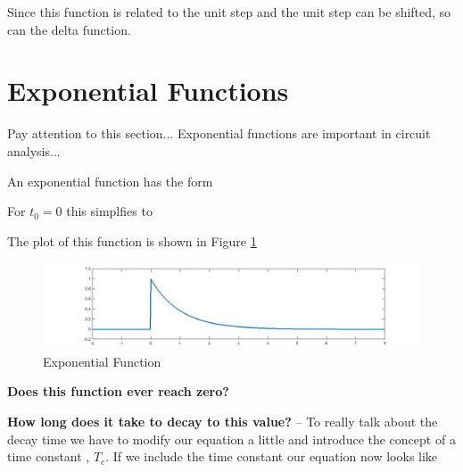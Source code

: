 \documentclass{handout}
\begin{document}
Since this function is related to the unit step and the unit step can be shifted, so can the delta function.

\newpage
\clearpage
\pagebreak

\section{Exponential Functions}
Pay attention to this section... Exponential functions are important in circuit analysis...

An exponential function has the form

For $t_0 =0$ this simplfies to

The plot of this function is shown in Figure \ref{fig: Exponential}
\begin{figure} [h!]
\centering
\includegraphics[width=1\textwidth]{Exponential.jpg}
\caption{Exponential Function}
\label{fig: Exponential}
\end{figure}

\textbf{Does this function ever reach zero?}

\textbf{How long does it take to decay to this value?} -- To really talk about the decay time we have to modify our equation a little and introduce the concept of a time constant , $T_c$.  If we include the time constant our equation now looks like
\end{document}
